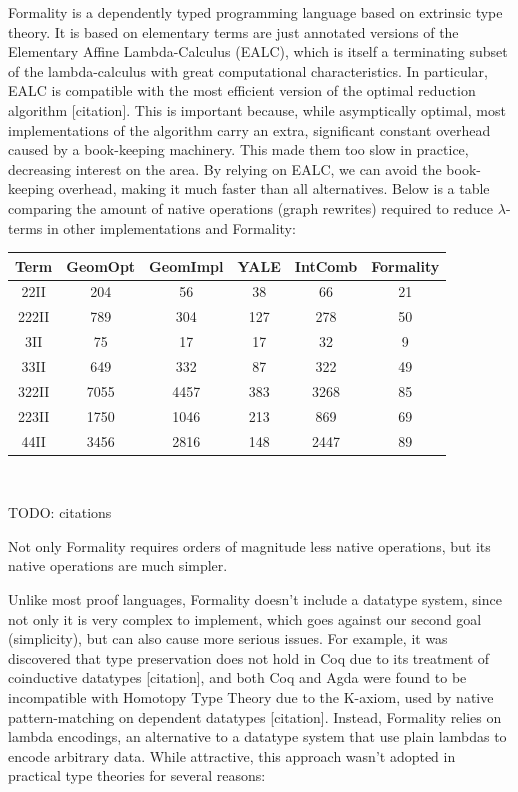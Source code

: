 \documentclass{article}
\theoremstyle{definition}
\theoremstyle{theorem}
\begin{document}
Formality is a dependently typed programming language based on extrinsic type
theory. It is based on elementary terms are just annotated versions of the
Elementary Affine Lambda-Calculus (EALC), which is itself a terminating subset
of the lambda-calculus with great computational characteristics. In particular,
EALC is compatible with the most efficient version of the optimal reduction
algorithm [citation]. This is important because, while asymptically optimal,
most implementations of the algorithm carry an extra, significant constant
overhead caused by a book-keeping machinery. This made them too slow in
practice, decreasing interest on the area. By relying on EALC, we can avoid the
book-keeping overhead, making it much faster than all alternatives. Below is a
table comparing the amount of native operations (graph rewrites) required to
reduce $\lambda$-terms in other implementations and Formality:

\hfill \newline
 \begin{tabular}{ c | c | c | c | c | c}
Term & GeomOpt & GeomImpl & YALE & IntComb & Formality \\\hline
 22II &     204 &       56 &   38 &      66 &        21\\
222II &     789 &      304 &  127 &     278 &        50\\
  3II &      75 &       17 &   17 &      32 &         9\\
 33II &     649 &      332 &   87 &     322 &        49\\
322II &    7055 &     4457 &  383 &    3268 &        85\\
223II &    1750 &     1046 &  213 &     869 &        69\\
 44II &    3456 &     2816 &  148 &    2447 &        89\\
\end{tabular}
\\ \hfill \newline

TODO: citations

Not only Formality requires orders of magnitude less native operations, but its
native operations are much simpler.

Unlike most proof languages, Formality doesn't include a datatype system, since
not only it is very complex to implement, which goes against our second goal
(simplicity), but can also cause more serious issues. For example, it was
discovered that type preservation does not hold in Coq due to its treatment of
coinductive datatypes [citation], and both Coq and Agda were found to be
incompatible with Homotopy Type Theory due to the K-axiom, used by native
pattern-matching on dependent datatypes [citation]. Instead, Formality relies on
lambda encodings, an alternative to a datatype system that use plain lambdas to
encode arbitrary data. While attractive, this approach wasn't adopted in
practical type theories for several reasons:
\end{document}
